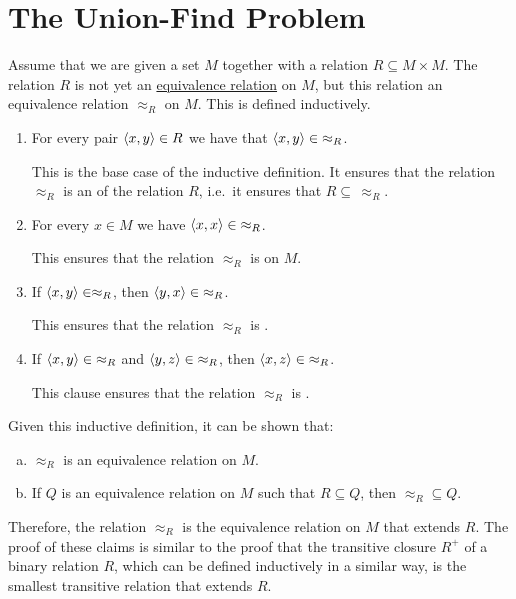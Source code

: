 \section{The Union-Find Problem \label{sec:union-find}}
Assume that we are given a set $M$ together with a relation $R \subseteq M \times M$.  The relation
$R$ is not yet an  \href{https://en.wikipedia.org/wiki/Equivalence_relation}{equivalence relation} on $M$, but
this relation  an equivalence relation $\approx_R$ on $M$.  This
 is defined inductively. 
\begin{enumerate}
\item For every pair $\pair(x,y) \in R$ we have that $\pair(x, y) \in\; \approx_R$.

      This is the base case of the inductive definition.  It ensures that the relation
      $\approx_R$ is an  of the relation $R$, i.e.~it ensures that $R \subseteq\, \approx_R$.
\item For every $x \in M$ we have $\pair(x,x) \in\; \approx_R$.

      This ensures that the relation $\approx_R$ is  on $M$.
\item If $\pair(x,y) \in \approx_R$, then $\pair(y,x) \in\; \approx_R$.

      This  ensures that the relation $\approx_R$ is .
\item If $\pair(x,y) \in\; \approx_R$ and $\pair(y,z) \in\; \approx_R$, then $\pair(x,z) \in\; \approx_R$.

      This clause ensures that the relation $\approx_R$ is .
\end{enumerate}
Given this inductive definition, it can be shown that:
\begin{enumerate}[(a)]
\item $\approx_R$ is an equivalence relation on $M$.
\item If $Q$ is an equivalence relation on $M$ such that $R \subseteq Q$, then $\approx_R \subseteq Q$.
\end{enumerate}
Therefore, the relation $\approx_R$ is the 
equivalence relation on $M$ that extends $R$.  The proof of these claims is similar to the proof that the
transitive closure $R^+$ of a binary relation $R$, which can be defined inductively in a similar way, is the
smallest transitive relation that extends $R$.

